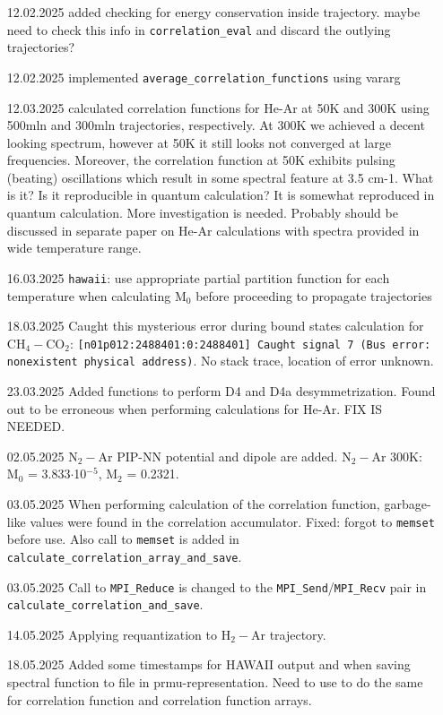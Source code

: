 \documentclass{article}
\begin{document}
\begin{enumerate}
    \item [12.02.2025] added checking for energy conservation inside trajectory. {\color{red} maybe need to check this info in \texttt{correlation\_eval} and discard the outlying trajectories?}
    \item [12.02.2025] implemented \texttt{average\_correlation\_functions} using vararg
    \item [12.03.2025] calculated correlation functions for He-Ar at 50K and 300K using 500mln and 300mln trajectories, respectively. At 300K we achieved a decent looking spectrum, however at 50K it still looks not converged at large frequencies. Moreover, the correlation function at 50K exhibits pulsing (beating) oscillations which result in some spectral feature at 3.5 cm-1. What is it? Is it reproducible in quantum calculation? {\color{red} It is somewhat reproduced in quantum calculation. More investigation is needed. Probably should be discussed in separate paper on He-Ar calculations with spectra provided in wide temperature range.}
    \item [16.03.2025] \texttt{hawaii}: use appropriate partial partition function for each temperature when calculating M$_0$ before proceeding to propagate trajectories
    \item [18.03.2025] Caught this mysterious error during bound states calculation for CH$_4-$CO$_2$: \texttt{[n01p012:2488401:0:2488401] Caught signal 7 (Bus error: nonexistent physical address)}. No stack trace, location of error unknown.
    \item [23.03.2025] Added functions to perform D4 and D4a desymmetrization. {\color{red} Found out to be erroneous when performing calculations for He-Ar. FIX IS NEEDED.}
    \item [02.05.2025] N$_2-$Ar PIP-NN potential and dipole are added. N$_2-$Ar 300K: M$_0$ = 3.833$\cdot$10$^{-5}$, M$_2$ = 0.2321.
    \item [03.05.2025] When performing calculation of the correlation function, garbage-like values were found in the correlation accumulator. Fixed: forgot to \texttt{memset} before use. Also call to \texttt{memset} is added in \texttt{calculate\_correlation\_array\_and\_save}.
    \item [03.05.2025] Call to \texttt{MPI\_Reduce} is changed to the \texttt{MPI\_Send}/\texttt{MPI\_Recv} pair in \texttt{calculate\_correlation\_and\_save}.
    \item [14.05.2025] Applying requantization to H$_2-$Ar trajectory.
    \item [18.05.2025] Added some timestamps for HAWAII output and when saving spectral function to file in prmu-representation. {\color{red} Need to use to do the same for correlation function and correlation function arrays.}
\end{enumerate}
\end{document}
